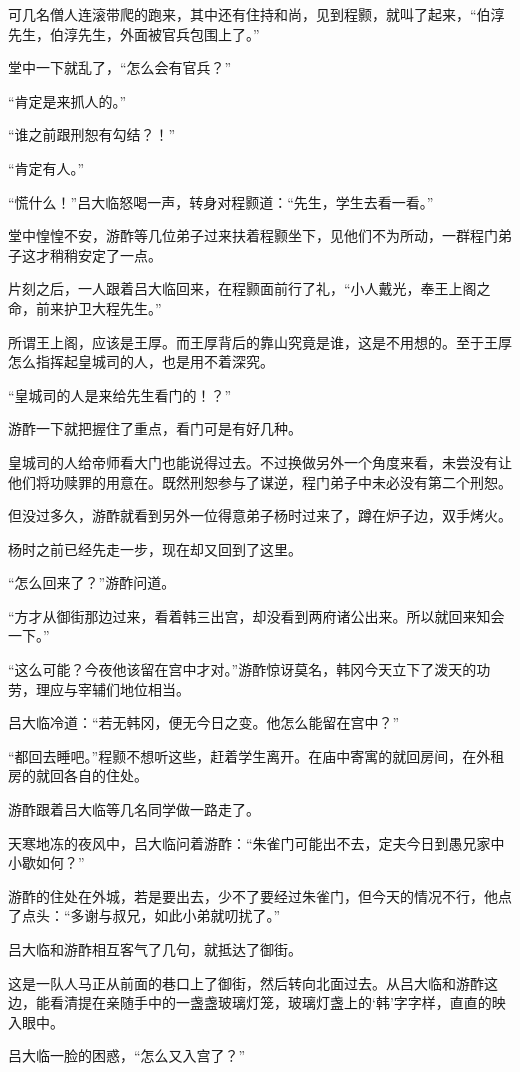 可几名僧人连滚带爬的跑来，其中还有住持和尚，见到程颢，就叫了起来，“伯淳先生，伯淳先生，外面被官兵包围上了。”

堂中一下就乱了，“怎么会有官兵？”

“肯定是来抓人的。”

“谁之前跟刑恕有勾结？！”

“肯定有人。”

“慌什么！”吕大临怒喝一声，转身对程颢道：“先生，学生去看一看。”

堂中惶惶不安，游酢等几位弟子过来扶着程颢坐下，见他们不为所动，一群程门弟子这才稍稍安定了一点。

片刻之后，一人跟着吕大临回来，在程颢面前行了礼，“小人戴光，奉王上阁之命，前来护卫大程先生。”

所谓王上阁，应该是王厚。而王厚背后的靠山究竟是谁，这是不用想的。至于王厚怎么指挥起皇城司的人，也是用不着深究。

“皇城司的人是来给先生看门的！？”

游酢一下就把握住了重点，看门可是有好几种。

皇城司的人给帝师看大门也能说得过去。不过换做另外一个角度来看，未尝没有让他们将功赎罪的用意在。既然刑恕参与了谋逆，程门弟子中未必没有第二个刑恕。

但没过多久，游酢就看到另外一位得意弟子杨时过来了，蹲在炉子边，双手烤火。

杨时之前已经先走一步，现在却又回到了这里。

“怎么回来了？”游酢问道。

“方才从御街那边过来，看着韩三出宫，却没看到两府诸公出来。所以就回来知会一下。”

“这么可能？今夜他该留在宫中才对。”游酢惊讶莫名，韩冈今天立下了泼天的功劳，理应与宰辅们地位相当。

吕大临冷道：“若无韩冈，便无今日之变。他怎么能留在宫中？”

“都回去睡吧。”程颢不想听这些，赶着学生离开。在庙中寄寓的就回房间，在外租房的就回各自的住处。

游酢跟着吕大临等几名同学做一路走了。

天寒地冻的夜风中，吕大临问着游酢：“朱雀门可能出不去，定夫今日到愚兄家中小歇如何？”

游酢的住处在外城，若是要出去，少不了要经过朱雀门，但今天的情况不行，他点了点头：“多谢与叔兄，如此小弟就叨扰了。”

吕大临和游酢相互客气了几句，就抵达了御街。

这是一队人马正从前面的巷口上了御街，然后转向北面过去。从吕大临和游酢这边，能看清提在亲随手中的一盏盏玻璃灯笼，玻璃灯盏上的‘韩’字字样，直直的映入眼中。

吕大临一脸的困惑，“怎么又入宫了？”